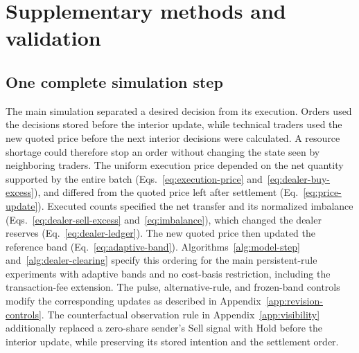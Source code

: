 \section{Supplementary methods and validation}
\label{app:supplement}
\setcounter{algorithm}{0}
\renewcommand{\thealgorithm}{S\arabic{algorithm}}

\subsection{One complete simulation step}

The main simulation separated a desired decision from its execution. Orders
used the decisions stored before the interior update, while technical
traders used the new quoted price before the next interior decisions
were calculated. A resource shortage could therefore stop an order
without changing the state seen by neighboring traders. The uniform
execution price depended on the net quantity supported by the entire
batch (Eqs.~\ref{eq:execution-price} and~\ref{eq:dealer-buy-excess}), and
differed from the quoted price left after settlement
(Eq.~\ref{eq:price-update}). Executed counts specified the net transfer
and its normalized imbalance (Eqs.~\ref{eq:dealer-sell-excess}
and~\ref{eq:imbalance}), which changed the dealer reserves
(Eq.~\ref{eq:dealer-ledger}). The new quoted price then updated the reference
band (Eq.~\ref{eq:adaptive-band}).
Algorithms~\ref{alg:model-step} and~\ref{alg:dealer-clearing} specify this
ordering for the main persistent-rule experiments with adaptive bands
and no cost-basis restriction, including the transaction-fee extension.
The pulse, alternative-rule, and frozen-band
controls modify the corresponding updates as described in
Appendix~\ref{app:revision-controls}. The counterfactual observation rule
in Appendix~\ref{app:visibility} additionally replaced a zero-share
sender's Sell signal with Hold before the interior update, while
preserving its stored intention and the settlement order.

